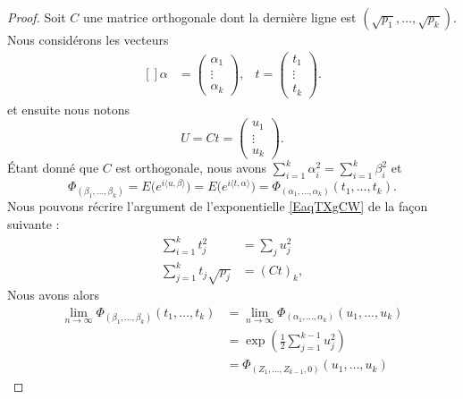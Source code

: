\begin{proof}
	Soit \( C\) une matrice orthogonale dont la dernière ligne est \( (\sqrt{p_1},\ldots, \sqrt{p_k})\). Nous considérons les vecteurs
	\begin{equation}
		\begin{aligned}[]
			\alpha & =\begin{pmatrix}
				\alpha_1 \\
				\vdots   \\
				\alpha_k
			\end{pmatrix},
			       & t=\begin{pmatrix}
				t_1    \\
				\vdots \\
				t_k
			\end{pmatrix}.
		\end{aligned}
	\end{equation}
	et ensuite nous notons
	\begin{equation}
		U=Ct=\begin{pmatrix}
			u_1    \\
			\vdots \\
			u_k
		\end{pmatrix}.
	\end{equation}
	Étant donné que \( C\) est orthogonale, nous avons \( \sum_{i=1}^k\alpha_i^2=\sum_{i=1}^k\beta_i^2\) et
	\begin{equation}
		\Phi_{(\beta_1,\ldots, \beta_k)}=E\big(  e^{i\langle u, \beta\rangle } \big)=E\big(  e^{i\langle t, \alpha\rangle } \big)=\Phi_{(\alpha_1,\ldots, \alpha_k)}(t_1,\ldots, t_k).
	\end{equation}
	Nous pouvons récrire l'argument de l'exponentielle \eqref{EaqTXgCW} de la façon suivante :
	\begin{subequations}
		\begin{align}
			\sum_{i=1}^kt_j^2         & =\sum_ju_j^2 \\
			\sum_{j=1}^kt_j\sqrt{p_j} & =(Ct)_{k},
		\end{align}
	\end{subequations}
	Nous avons alors
	\begin{subequations}
		\begin{align}
			\lim_{n\to \infty} \Phi_{(\beta_1,\ldots, \beta_k)}(t_1,\ldots, t_k) & =\lim_{n\to \infty} \Phi_{(\alpha_1,\ldots, \alpha_k)}(u_1,\ldots, u_k) \\
			                                                                     & =\exp\left( \frac{ 1 }{2}\sum_{j=1}^{k-1}u_j^2 \right)                  \\
			                                                                     & =\Phi_{(Z_1,\ldots, Z_{k-1},0)}(u_1,\ldots, u_k)

\end{align}
\end{subequations}
\end{proof}
